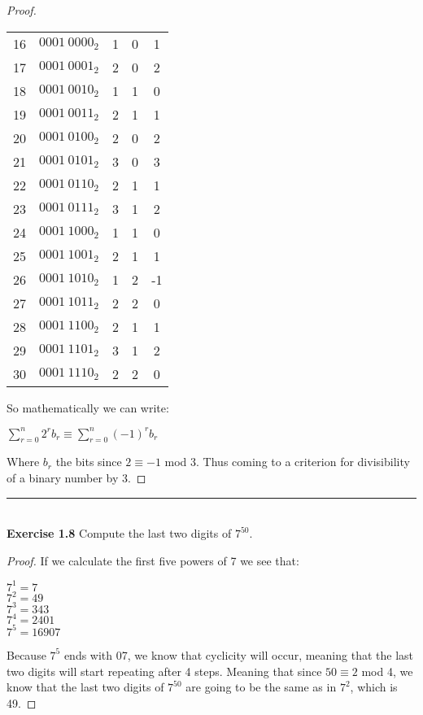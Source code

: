 \documentclass{article}
\begin{document}
\begin{proof}
\begin{center}
\begin{tabular}{ c c c c c  }
 16 & $0001\ 0000_2$ & 1 & 0 & 1 \\ 
 17 & $0001\ 0001_2$ & 2 & 0 & 2 \\ 
 18 & $0001\ 0010_2$ & 1 & 1 & 0 \\ 
 19 & $0001\ 0011_2$ & 2 & 1 & 1 \\ 
 20 & $0001\ 0100_2$ & 2 & 0 & 2 \\ 
 21 & $0001\ 0101_2$ & 3 & 0 & 3 \\ 
 22 & $0001\ 0110_2$ & 2 & 1 & 1 \\ 
 23 & $0001\ 0111_2$ & 3 & 1 & 2 \\ 
 24 & $0001\ 1000_2$ & 1 & 1 & 0 \\ 
 25 & $0001\ 1001_2$ & 2 & 1 & 1 \\ 
 26 & $0001\ 1010_2$ & 1 & 2 & -1 \\ 
 27 & $0001\ 1011_2$ & 2 & 2 & 0 \\ 
 28 & $0001\ 1100_2$ & 2 & 1 & 1 \\ 
 29 & $0001\ 1101_2$ & 3 & 1 & 2 \\ 
 30 & $0001\ 1110_2$ & 2 & 2 & 0
\end{tabular}
\end{center}
So mathematically we can write:
\begin{center}
	$\sum_{r=0}^{n} 2^{r}b_{r} \equiv \sum_{r=0}^{n} {(-1)}^{r}b_{r}$
\end{center}
Where $b_{r}$ the bits since $2 \equiv -1$ mod 3. Thus coming to a criterion for divisibility of a binary number by 3.
\end{proof}



\noindent\rule{12cm}{0.4pt}\\
\noindent \textbf{Exercise 1.8} Compute the last two digits of $7^{50}$.
\begin{proof}
	If we calculate the first five powers of 7 we see that:
\begin{center}
	$7^1 = 7$\\
	$7^2 = 49$\\
	$7^3 = 343$\\
	$7^4 = 2401$\\
	$7^5 = 16907$
\end{center}
Because $7^5$ ends with 07, we know that cyclicity will occur, meaning that the last two digits will start repeating after 4 steps. Meaning that since $50 \equiv 2$ mod 4, we know that the last two digits of $7^{50}$ are going to be the same as in $7^2$, which is 49.
\end{proof}
\end{document}
